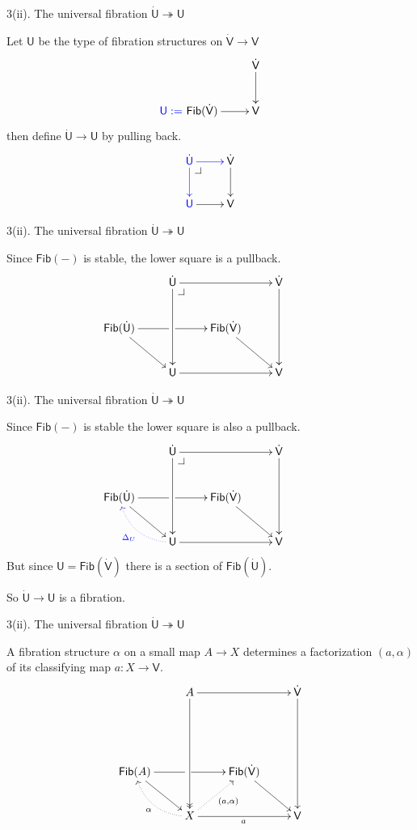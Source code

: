 \documentclass[handout]{beamer}
\makeatletter
\newcommand{\pbcorner}[1][dr]{\save*!/#1-1.2pc/#1:(-1,1)@^{|-}\restore}
\newcommand{\ra}{\ensuremath{\rightarrow}}
\renewcommand{\epi}{\twoheadrightarrow}
\newcommand{\U}{\mathsf{U}}
\newcommand{\UU}{\dot{\mathsf{U}}}
\newcommand{\V}{\mathsf{V}}
\newcommand{\VV}{\dot{\mathsf{V}}}
\theoremstyle{remark}
\makeatother
\begin{document}
\begin{frame}{3(ii). The universal fibration $\UU\epi\U$}

Let $\U$ be the type of fibration structures on $\VV\ra\V$
\[
\xymatrix{
& {\VV} \ar[d] \\
{\color{blue}\U :=}\ \mathsf{Fib}(\VV) \ar[r] & \V
}
\]
\pause
then define $\UU\ra\U$ by pulling back.
\[
\xymatrix{
{\color{blue}\UU} \ar@[blue][d] \ar@[blue][r]  \pbcorner & {\VV} \ar[d] \\
{\color{blue}\U} \ar[r] & \V
}
\]

\end{frame}
\begin{frame}{3(ii). The universal fibration $\UU\epi\U$}

Since $\mathsf{Fib}(-)$ is stable, the lower square is a pullback. 
\[
\xymatrix{
& \UU \ar[dd] \ar[rr] \pbcorner && \VV \ar[dd] & \\
\mathsf{Fib}(\UU) \ar[rd] \ar[rr] |<<<<<<<<<<<\hole  &&  \mathsf{Fib}(\VV) \ar[rd] \\
& \U \ar[rr] && \V &
}
\]
  
\end{frame}
\begin{frame}{3(ii). The universal fibration $\UU\epi\U$}

Since $\mathsf{Fib}(-)$ is stable the lower square is also a pullback. 
\[
\xymatrix{
& \UU \ar[dd] \ar[rr] \pbcorner && \VV \ar[dd] & \\
\mathsf{Fib}(\UU) \ar[rd] \ar[rr] |<<<<<<<<<<<\hole  &&  \mathsf{Fib}(\VV) \ar[rd] \\
& \U \ar[rr] \ar@[blue]@{.>}@/^1pc/[lu]^{\color{blue}\Delta_U} && \V &
}
\]
\pause
But since $\U = \mathsf{Fib}(\VV)$ there is a section of $\mathsf{Fib}(\UU)$.
\pause

So $\UU\ra \U$ is a fibration.
  
\end{frame}
\begin{frame}{3(ii). The universal fibration $\UU\epi\U$}

A fibration structure $\alpha$ on a small map $A\ra X$ determines a factorization $(a,\alpha)$ of its classifying map  $a : X\ra\V$. 
\[
\xymatrix{
&A \ar@{->>}[ddd] \ar[rr]  && {\VV}\ar[ddd]\\
&&&\\
\mathsf{Fib}(A) \ar[rd] \ar[rr] |<<<<<<<<<<<\hole  && \mathsf{Fib}(\VV) \ar[rd] &\\
&X \ar[rr]_a \ar@{.>}@/^1pc/[lu]^\alpha \ar@{.>}[ru]_>>>>>>>{(a,\alpha)} && \V
}
\]

\end{frame}
\end{document}
